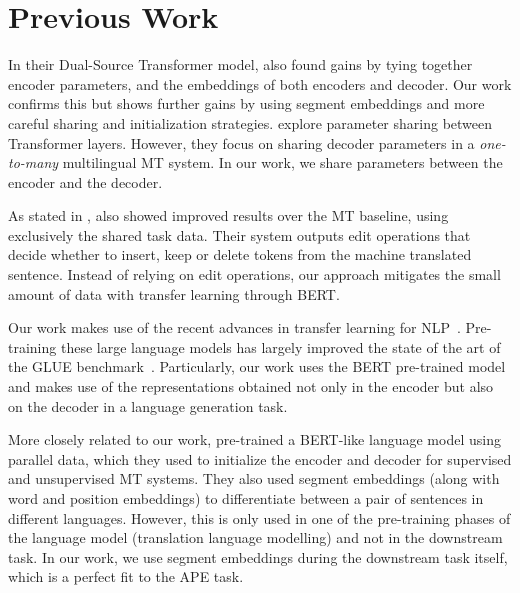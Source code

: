 \section{Previous Work}

In their Dual-Source Transformer model, \citet{junczys2018ms} also
found gains by tying together encoder parameters, and the embeddings
of both encoders and decoder. Our work confirms this but shows
further gains by using segment embeddings and more careful sharing
and initialization strategies. \citet{sachan2018parameter} explore
parameter sharing between Transformer layers. However, they focus on
sharing decoder parameters in a \emph{one-to-many} multilingual MT
system. In our work, we share parameters between the encoder and the
decoder.

As stated in , \citet{berard2017lig} also
showed improved results over the MT baseline, using exclusively the
shared task data. Their system outputs edit operations that decide
whether to insert, keep or delete tokens from the machine translated
sentence. Instead of relying on edit operations, our approach
mitigates the small amount of data with transfer learning through
BERT.

Our work makes use of the recent advances in transfer learning for
NLP~\citep{peters2018deep, howard2018universal, radford2018improving,
  devlin2018bert}. Pre-training these large language models has largely
improved the state of the art of the GLUE
benchmark~\citep{wang2018glue}. Particularly, our work uses the BERT
pre-trained model and makes use of the representations obtained not
only in the encoder but also on the decoder in a language generation
task.

More closely related to our work, \citet{lample2019cross}
pre-trained a BERT-like language model using parallel data, which
they used to initialize the encoder and decoder for supervised and
unsupervised MT systems. They also used segment embeddings (along
with word and position embeddings) to differentiate between a pair of
sentences in different languages. However, this is only used in one
of the pre-training phases of the language model (translation
language modelling) and not in the downstream task. In our work, we
use segment embeddings during the downstream task itself, which is a
perfect fit to the APE task.

